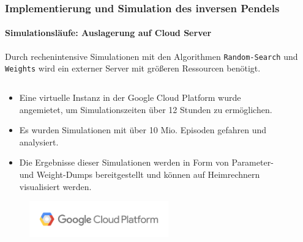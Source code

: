 \documentclass[10pt,t,aspectratio=1610]{beamer}
\newcommand{\ChapterCartpole}{Implementierung und Simulation des inversen Pendels}
\begin{document}
\begin{frame}
	\frametitle{\ChapterCartpole}
	\framesubtitle{Simulationsläufe: Auslagerung auf Cloud Server}
	\vspace{0.3cm}
	Durch rechenintensive Simulationen mit den Algorithmen \texttt{Random-Search} und \texttt{Weights} wird ein externer Server mit größeren Ressourcen benötigt.
	\vspace{0.1cm}
	\begin{columns}[T,onlytextwidth]
		\begin{column}{0.6\textwidth}
			\begin{itemize}
				\item Eine virtuelle Instanz in der Google Cloud Platform wurde angemietet, um Simulationszeiten über 12 Stunden zu ermöglichen.
				\item Es wurden Simulationen mit über 10 Mio. Episoden gefahren und analysiert.
				\item Die Ergebnisse dieser Simulationen werden in Form von Parameter- und Weight-\glqq Dumps\grqq{} bereitgestellt und können auf Heimrechnern visualisiert werden.
			\end{itemize}
			\begin{figure}[H] %
				\centering
				\includegraphics[width=6cm]{figures/gcp.png}
				\label{fig:gcp}
			\end{figure}
		\end{column}
		\hspace{-0.5cm}
		\begin{column}{0.4\textwidth}
			\vspace{-0.6cm}
			\begin{figure}[H] %
				\centering
				\scriptsize
				\def\svgwidth{4cm}
				
			\end{figure}
		\end{column}
	\end{columns}
\end{frame}

\end{document}
